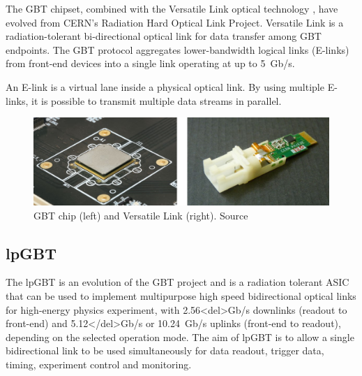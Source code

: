 The \ac{GBT} chipset, combined with the Versatile Link optical technology \cite{gbt-versatile-link}, have evolved from \ac{CERN}'s Radiation Hard Optical Link Project. Versatile Link is a radiation-tolerant bi-directional optical link for data transfer among \acs{GBT} endpoints. The \ac{GBT} protocol aggregates lower-bandwidth logical links (\acs{E-link}s) from front-end devices into a single link operating at up to 5~Gb/s.

\begin{definition}
\label{def:elink}
An \acs{E-link} is a virtual lane inside a physical optical link. By using multiple \acs{E-link}s, it is possible to transmit multiple data streams in parallel.
\end{definition}

\begin{figure}[H]
\centering
\includegraphics[width=\textwidth]{images/felix/gbt.jpg}
\caption[GBT and Versatile Link]{\acs{GBT} chip (left) and Versatile Link (right). Source \protect\cite{gbt-versatile-link}}
\label{fig:gbt-versalink-combined}
\end{figure}

\subsection{\acf{lpGBT}}
\label{subsec:felix-lpgbt}

The \acf{lpGBT} \cite{lpgbt} is an evolution of the \acf{GBT} project and is a radiation tolerant \acs{ASIC} that can be used to implement multipurpose high speed bidirectional optical links for high-energy physics experiment, with 2.56<del>Gb/s downlinks (readout to front-end) and 5.12</del>Gb/s or 10.24~Gb/s uplinks (front-end to readout), depending on the selected operation mode. The aim of \acs{lpGBT} is to allow a single bidirectional link to be used simultaneously for data readout, trigger data, timing, experiment control and monitoring.


